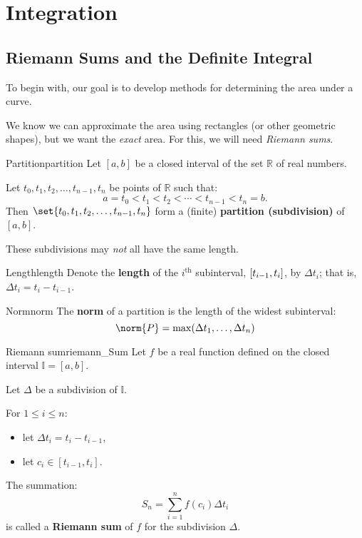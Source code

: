 \chapter{Integration}
\setcounter{section}{1}
\section{Riemann Sums and the Definite Integral}
To begin with, our goal is to develop methods for determining the area under a curve.

We know we can approximate the area using rectangles (or other geometric shapes), but
we want the \emph{exact} area. For this, we will need \emph{Riemann sums}.

\begin{Definition}{Partition}{partition}
    Let $ [a,b] $ be a closed interval of the set $ \mathbb{R} $ of real numbers.\smallskip

    Let $ t_0,t_1,t_2,\ldots,t_{n-1},t_n $ be points of $ \mathbb{R} $ such that:
    \[ a=t_0<t_1<t_2<\cdots<t_{n-1}<t_n=b. \]
    Then $ \set{t_0,t_1,t_2,\ldots,t_{n-1},t_n} $ form a (finite) \textbf{partition (subdivision)}
    of $ [a,b] $.
\end{Definition}

\begin{Remark}{}{}
    These subdivisions may \emph{not} all have the same length.
\end{Remark}

\begin{Definition}{Length}{length}
    Denote the \textbf{length} of the $ i^{\text{th}} $ subinterval,
    $ \interval{t_{i-1}}{t_i} $, by $ \Delta t_i $; that is, $ \Delta t_i=t_i-t_{i-1} $.
\end{Definition}

\begin{Definition}{Norm}{norm}
    The \textbf{norm} of a partition is the length of the widest subinterval:
    \[ \norm{P}=\max(\Delta t_1,\dots,\Delta t_{n}) \]
\end{Definition}

\begin{Definition}{Riemann sum}{riemann_Sum}
    Let $ f $ be a real function defined on the closed interval $ \mathbb{I}=[a,b] $.\smallskip

    Let $ \Delta $ be a subdivision of $ \mathbb{I} $.\smallskip

    For $ 1\le i\le n $:
    \begin{itemize}[]
        \item let $ \Delta t_i=t_i-t_{i-1} $,
        \item let $ c_i\in[t_{i-1},t_i] $.
    \end{itemize}
    The summation:
    \[ S_n=\sum\limits_{i=1}^{n} f(c_i)\Delta t_i \]
    is called a \textbf{Riemann sum} of $ f $ for the subdivision $ \Delta $.
\end{Definition}

